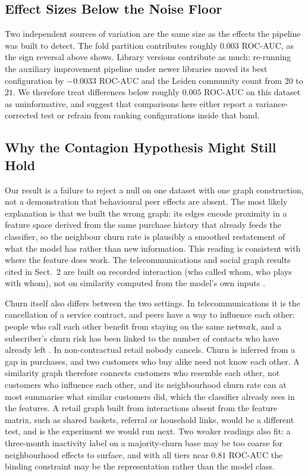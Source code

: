 \documentclass[runningheads]{llncs}
\begin{document}
\subsection{Effect Sizes Below the Noise Floor}

Two independent sources of variation are the same size as the effects the
pipeline was built to detect. The fold partition contributes roughly $0.003$
ROC-AUC, as the sign reversal above shows. Library versions contribute as much:
re-running the auxiliary improvement pipeline under newer libraries moved its best
configuration by $-0.0033$ ROC-AUC and the Leiden community count from $20$ to
$21$. We therefore treat differences below roughly $0.005$ ROC-AUC on this dataset
as uninformative, and suggest that comparisons here either report a
variance-corrected test or refrain from ranking configurations inside that band.

\subsection{Why the Contagion Hypothesis Might Still Hold}
\label{sec:contagion}

Our result is a failure to reject a null on one dataset with one graph
construction, not a demonstration that behavioural peer effects are absent. The
most likely explanation is that we built the wrong graph: its edges encode
proximity in a feature space derived from the same purchase history that already
feeds the classifier, so the neighbour churn rate is plausibly a smoothed
restatement of what the model has rather than new information. This reading is
consistent with where the feature does work. The telecommunications and social
graph results cited in Sect.~2 are built on recorded interaction (who called
whom, who plays with whom), not on similarity computed from the model's own
inputs \cite{kostic2020socialnetwork,lee2025tempodegraphnet}.

Churn itself also differs between the two settings. In telecommunications it is
the cancellation of a service contract, and peers have a way to influence each
other: people who call each other benefit from staying on the same network, and
a subscriber's churn risk has been linked to the number of contacts who have
already left \cite{kostic2020socialnetwork}. In non-contractual retail nobody
cancels. Churn is inferred from a gap in purchases, and two customers who buy
alike need not know each other. A similarity graph therefore connects customers who resemble each
other, not customers who influence each other, and its neighbourhood churn rate
can at most summarise what similar customers did, which the classifier already
sees in the features. A retail graph built from interactions absent from the
feature matrix, such as shared baskets, referral or household links, would be a
different test, and is the experiment we would run next.
Two weaker readings also fit: a three-month inactivity label on a majority-churn
base may be too coarse for neighbourhood effects to surface, and with all tiers
near $0.81$ ROC-AUC the binding constraint may be the representation rather than
the model class.
\end{document}

